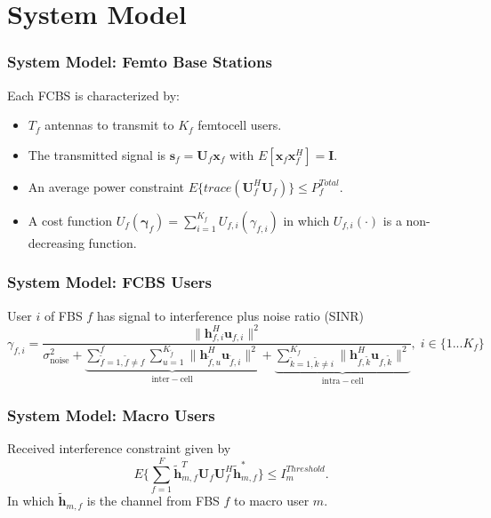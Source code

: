 \documentclass[10pt,tgadventor, onlymath]{beamer}
\begin{document}
\section{System Model}
\begin{frame}
\frametitle{System Model: Femto Base Stations}
Each FCBS is characterized by:
\\
\begin{itemize}
\item 
	$T_{f}$ antennas to transmit to $K_{f}$ femtocell users.
\item 
	The transmitted 		
	signal is $\mathbf{s}_{f
	}= \mathbf{U}_{f}\mathbf{x}_{f}$ with $E[\mathbf{x}_{f}\mathbf{x}_{f}^H] = \mathbf{I}$.
\item 
	An average power constraint $E\{trace(\mathbf{U}_{f}^H\mathbf{U}_{f})\} \leq P^{Total}_{f} $.
\item 
	A cost function $U_{f}(\boldsymbol{\gamma}_{f}) =
	\sum_{i=1}^{K_{f}}
    	 U_{f,i}(\gamma_{f,i}) $
    	in which $U_{f,i}(\cdot)$ is a non-decreasing function.

\end{itemize}
\end{frame}

\begin{frame}
\frametitle{System Model: FCBS Users}
User $i$ of FBS $f$ has signal to interference plus noise ratio (SINR)
	\begin{equation*}
	\gamma_{f,i} = \frac{\|\mathbf{h}^H_{f,i}\mathbf{u}_{f,i}\|^2}
	{\sigma^2_{\text{noise}}   +
	\underbrace{
	 \sum_{\tilde{f}=1, \tilde{f}\neq f}^{f} \sum_{u=1}^{K_{\tilde{f}}}
	\|\mathbf{h}^H_{\tilde{f},u}\mathbf{u}_{\tilde{f},i}\|^2}_{\mathrm{inter-cell}}
	 + 
	 \underbrace{
	 \sum_{\tilde{k}=1, \tilde{k}\neq i}^{K_f}
	 \|\mathbf{h}^H_{f,\tilde{k}}\mathbf{u}_{f,\tilde{k}}\|^2}_{\mathrm{intra-cell}}},
	  \; i \in \{1 ... K_f\}
	  \end{equation*}
\end{frame}

\begin{frame}
\frametitle{System Model: Macro Users}
	Received interference constraint given by 
	\begin{equation}
	E\{\sum^F_{f=1} \mathbf{\tilde{h}}_{m,f}^T  \mathbf{U}_{f}					
	\mathbf{U}_{f}^{H} \mathbf{\tilde{h}}_{m,f}^*\} \leq I^{Threshold}		
	_{m} .
	\end{equation} In which $\mathbf{\tilde{h}}_{m,f}$ is the channel from FBS $f$ to macro user $m$.
\end{frame}
\end{document}
